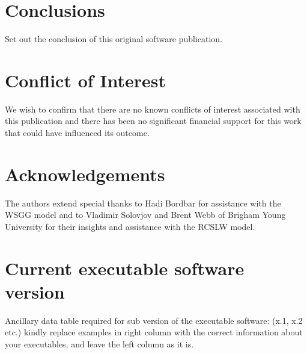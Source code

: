 \documentclass[preprint,12pt, a4paper]{elsarticle}
\begin{document}
\section{Conclusions}
\label{}

Set out the conclusion of this original software publication.

\section{Conflict of Interest}
%

We wish to confirm that there are no known conflicts of interest associated with this publication and there has been no significant financial support for this work that could have influenced its outcome.


\section*{Acknowledgements}
\label{}

The authors extend special thanks to Hadi Bordbar for assistance with the WSGG model and to Vladimir Solovjov and Brent Webb of Brigham Young University for their insights and assistance with the RCSLW model. 





 
 

\section*{Current executable software version}
\label{}

Ancillary data table required for sub version of the executable software: (x.1, x.2 etc.) kindly replace examples in right column with the correct information about your executables, and leave the left column as it is.
\end{document}
